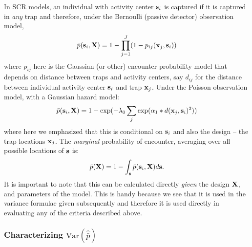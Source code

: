 In SCR models, an individual with activity center ${\bf
  s}_{i}$ is captured if it is captured in {\it any} trap and
therefore, under the Bernoulli (passive detector) observation model,
\[
 \bar{p}({\bf s}_{i}, {\bf X}) = 1 - \prod_{j=1}^{J} (1- p_{ij}({\bf
   x}_{j}, {\bf s}_{i}))
\]
where $p_{ij}$ here is the Gaussian (or other) encounter probability
model that depends on distance between traps and activity centers,
say $d_{ij}$ for the distance between 
individual activity center ${\bf s}_{i}$ and trap ${\bf x}_{j}$.
Under the Poisson observation model, with a Gaussian hazard model:
\[
 \bar{p}({\bf s}_{i},{\bf X}) = 1 -  \exp(-\lambda_{0} \sum_{j}
 \exp(\alpha_{1}* d({\bf x}_{j}, {\bf s}_{i})^2 ))
\]
where here we emphasized that this is conditional on ${\bf s}_{i}$ and
also the design -- the trap locations ${\bf x}_{j}$.  The {\it
  marginal} probability of encounter, averaging over all possible
locations of ${\bf s}$ is:
\begin{equation}
 \bar{p}({\bf X}) = 1 - \int_{\bf s}    \bar{p}({\bf s}_{i},{\bf X})    d{\bf s}.
\label{design.eq.pbar}
\end{equation}
It is important to note that this can be calculated directly {\it
  given} the design ${\bf X}$, and parameters of the model. This is
handy because we see that it is used in the variance formulae given
subsequently and therefore it is used directly in evaluating any of
the criteria described above.


\subsubsection{Characterizing $\mbox{Var}(\hat{\bar{p}})$}

